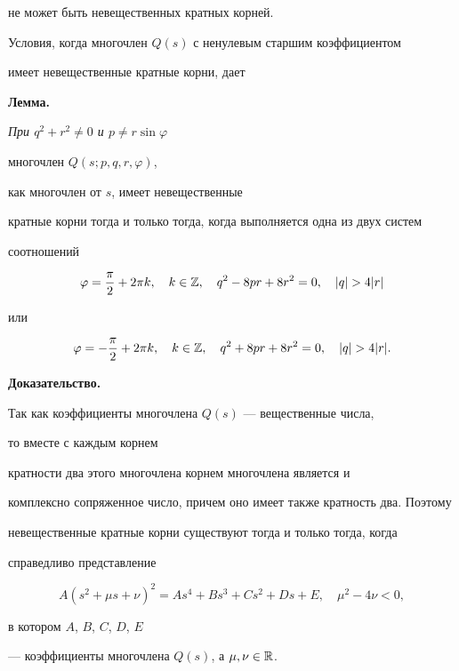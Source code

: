 не может быть невещественных кратных корней.


Условия, когда многочлен $Q(s)$ с ненулевым старшим коэффициентом


имеет невещественные кратные корни, дает


\medskip





{\bf Лемма.}


{\it При $q^2+r^2 \ne 0$ и $p \ne r\sin \varphi$


многочлен $Q(s;p,q,r,\varphi)$,


как многочлен от $s$, имеет невещественные


кратные корни тогда и только тогда, когда выполняется одна из двух систем


соотношений


$$


\varphi=\frac{\pi}


{2}+2\pi k, \quad k \in\Bbb Z,\quad q^2 - 8pr+8r^2=0,\quad |q| > 4 | r |


$$


или


$$


\varphi=- \frac {\pi}{2}+2\pi k, \quad k \in\Bbb Z,\quad q^2+8pr+8r^2=0,


\quad |q| > 4 | r |.


$$


}





{\bf Доказательство.}


Так как коэффициенты многочлена $Q(s)$ --- вещественные числа,


то вместе с каждым корнем


кратности два этого многочлена корнем многочлена является и


комплексно сопряженное число, причем оно имеет также кратность два. Поэтому


невещественные кратные корни существуют тогда и только тогда, когда


справедливо представление


$$


A(s^2+\mu s+\nu)^2=As^4+Bs^3+Cs^2+Ds+E,\quad


\mu ^2 - 4\nu < 0,


$$


в котором $A$, $B$, $C$, $D$, $E$


--- коэффициенты многочлена $Q(s)$, а $\mu, \nu \in \Bbb R$.


